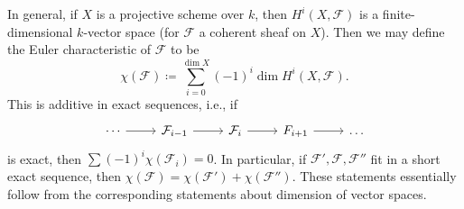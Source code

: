 In general, if $X$ is a projective scheme over $k$, then $H^i(X, \mathcal{F})$ is
a finite-dimensional $k$-vector space (for $\mathcal{F}$ a coherent sheaf on $X$).
Then we may define the Euler characteristic of $\mathcal{F}$ to be
\[ \chi(\mathcal{F})\coloneqq \sum_{i=0}^{\dim X} (-1)^i\dim H^i(X, \mathcal{F}). \]
This is additive in exact sequences, i.e., if
\[\begin{tikzcd}
	\cdots\ar[r] & \mathcal{F}_{i-1}\ar[r] & \mathcal{F}_i\ar[r] & F_{i+1} \ar[r] & \ldots
\end{tikzcd}\]
is exact, then $\sum (-1)^i \chi(\mathcal{F}_i) = 0 $. In particular, if
$\mathcal{F}', \mathcal{F}, \mathcal{F}''$ fit in a short exact sequence, then
$\chi(\mathcal{F}) = \chi(\mathcal{F}') + \chi(\mathcal{F}'')$. These statements
essentially follow from the corresponding statements about dimension of vector spaces.
